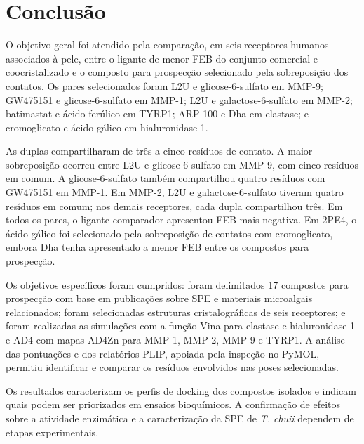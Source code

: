 \section{Conclusão}
O objetivo geral foi atendido pela comparação, em seis receptores humanos associados à pele, entre o ligante de menor FEB do conjunto comercial e coocristalizado e o composto para prospecção selecionado pela sobreposição dos contatos. Os pares selecionados foram L2U e glicose-6-sulfato em MMP-9; GW475151 e glicose-6-sulfato em MMP-1; L2U e galactose-6-sulfato em MMP-2; batimastat e ácido ferúlico em TYRP1; ARP-100 e Dha em elastase; e cromoglicato e ácido gálico em hialuronidase 1.

As duplas compartilharam de três a cinco resíduos de contato. A maior sobreposição ocorreu entre L2U e glicose-6-sulfato em MMP-9, com cinco resíduos em comum. A glicose-6-sulfato também compartilhou quatro resíduos com GW475151 em MMP-1. Em MMP-2, L2U e galactose-6-sulfato tiveram quatro resíduos em comum; nos demais receptores, cada dupla compartilhou três. Em todos os pares, o ligante comparador apresentou FEB mais negativa. Em 2PE4, o ácido gálico foi selecionado pela sobreposição de contatos com cromoglicato, embora Dha tenha apresentado a menor FEB entre os compostos para prospecção.

Os objetivos específicos foram cumpridos: foram delimitados 17 compostos para prospecção com base em publicações sobre SPE e materiais microalgais relacionados; foram selecionadas estruturas cristalográficas de seis receptores; e foram realizadas as simulações com a função Vina para elastase e hialuronidase 1 e AD4 com mapas AD4Zn para MMP-1, MMP-2, MMP-9 e TYRP1. A análise das pontuações e dos relatórios PLIP, apoiada pela inspeção no PyMOL, permitiu identificar e comparar os resíduos envolvidos nas poses selecionadas.

Os resultados caracterizam os perfis de docking dos compostos isolados e indicam quais podem ser priorizados em ensaios bioquímicos. A confirmação de efeitos sobre a atividade enzimática e a caracterização da SPE de \textit{T. chuii} dependem de etapas experimentais.
